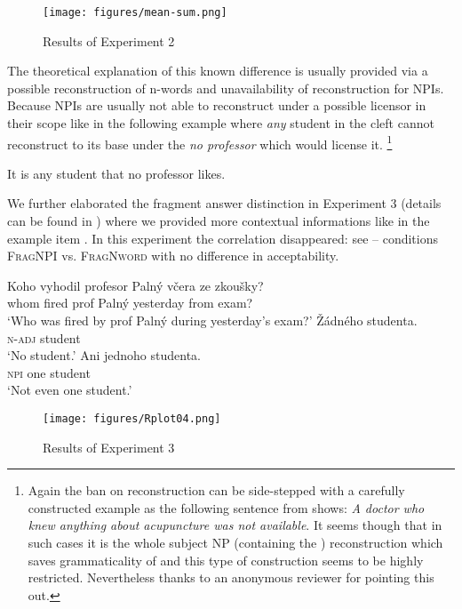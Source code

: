 \documentclass[output=paper, colorlinks, citecolor=brown, newtxmath]{langsci/langscibook}
\begin{document}
\begin{figure}
\centering
\texttt{[image: figures/mean-sum.png]}
\caption{Results of Experiment 2}\label{fig:exp2}
\end{figure}

\noindent The theoretical explanation of this known difference is usually provided via a possible reconstruction of n-words and unavailability of reconstruction for NPIs. Because NPIs are usually not able to reconstruct under a possible licensor in their scope \citep{de1998licensing} like in the following example where  \textit{any} student in the cleft cannot reconstruct to its base  under the  \textit{no professor} which would license it.%
\footnote{Again the ban on  reconstruction can be side-stepped with a carefully constructed example as the following sentence from \cite[p.17]{uribe1994interface} shows: \textit{A doctor who knew anything about acupuncture was not available}. It seems though that in such cases it is the whole subject NP (containing the ) reconstruction which saves grammaticality of  and this type of construction seems to be highly restricted. Nevertheless thanks to an anonymous reviewer for pointing this out.}

\ea *It is any student that no professor likes.
\z

\noindent We further elaborated the fragment answer distinction in Experiment 3 (details can be found in \citealt{docekaldotlacilsubber}) where we provided more contextual informations like in the example item . In this experiment the correlation disappeared: see  -- conditions \textsc{FragNPI} vs. \textsc{FragNword} with no difference in acceptability.

\ea \label{ex-35} \gll Koho vyhodil profesor Palný včera ze zkoušky?\\
whom fired prof Palný yesterday from exam?\\
\glt `Who was fired by prof Palný during yesterday's exam?'
\ea \gll Žádného studenta.\\
\textsc{n-adj} student\\
\glt `No student.'
\ex \gll Ani jednoho studenta.\\
\textsc{npi} one student\\
\glt `Not even one student.'
\z
\z

\begin{figure}
\centering
\texttt{[image: figures/Rplot04.png]}
\caption{Results of Experiment 3}\label{fig:exp3}
\end{figure}
\end{document}
